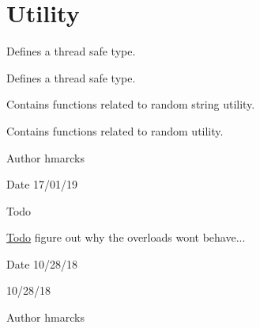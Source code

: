 \hypertarget{group__utility}{}\section{Utility}
\label{group__utility}


Defines a thread safe type.  


Defines a thread safe type. 

Contains functions related to random string utility.

Contains functions related to random utility.

\begin{DoxyAuthor}{Author}
hmarcks
\end{DoxyAuthor}
\begin{DoxyDate}{Date}
17/01/19
\end{DoxyDate}
\begin{DoxyRefDesc}{Todo}
\item[\mbox{\hyperlink{todo__todo000040}{Todo}}]figure out why the overloads won\textquotesingle{}t behave... \end{DoxyRefDesc}


\begin{DoxyDate}{Date}
10/28/18

10/28/18
\end{DoxyDate}
\begin{DoxyAuthor}{Author}
hmarcks 
\end{DoxyAuthor}
